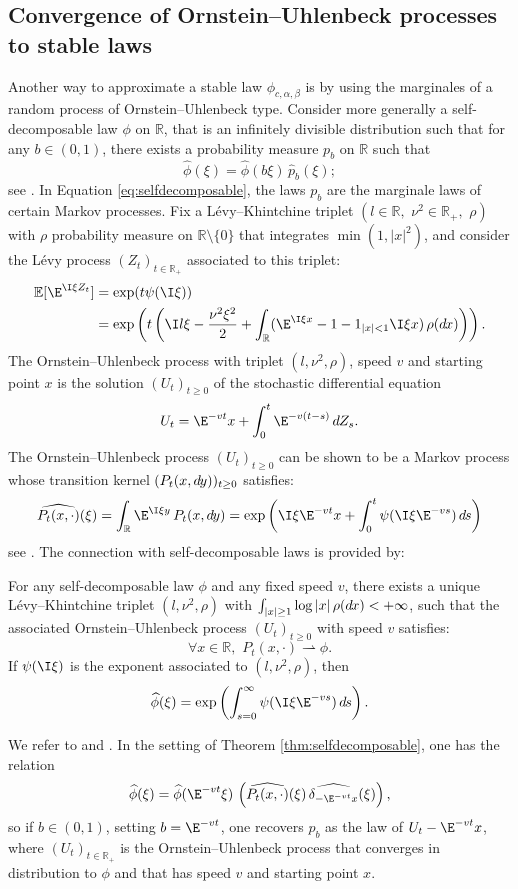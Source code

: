 \documentclass[envcountsame]{svmult}
\newcommand{\R}{\mathbb{R}}
\newcommand{\esper}{\mathbb{E}}
\newcommand{\DD}[1]{\,d\hspace*{-0.3mm}{#1}}
\begin{document}
\subsection{Convergence of Ornstein--Uhlenbeck processes to stable laws}\label{subsec:ornstein}
Another way to approximate a stable law $\phi_{c,\alpha,\beta}$ is by using the marginales of a random process of Ornstein--Uhlenbeck type. Consider more generally a self-decomposable law $\phi$ on $\R$, that is an infinitely divisible distribution such that for any $b\in (0,1)$, there exists a probability measure $p_b$ on $\R$ such that
\begin{equation}
\widehat{\phi}(\xi) = \widehat{\phi}(b\xi)\,\widehat{p}_b(\xi);\label{eq:selfdecomposable}
\end{equation}
see \cite[Chapter 3, Definition 15.1]{Sato99}. In Equation \eqref{eq:selfdecomposable}, the laws $p_b$ are the marginale laws of certain Markov processes. Fix a Lévy--Khintchine triplet $(l\in \R,\,\, \nu^2 \in \R_+,\,\,\rho)$ with $\rho$ probability measure on $\R \setminus \{0\}$ that integrates $\min(1,|x|^2)$, and consider the Lévy process $(Z_t)_{t \in \R_+}$ associated to this triplet:
\begin{align*}
\esper[\E^{\I \xi Z_t}] &= \exp(t\psi(\I \xi)) \\
&=  \exp\left(t\left(\I l \xi - \frac{\nu^2\xi^2}{2}+\int_{\R} (\E^{\I \xi x} - 1 - 1_{|x|<1}\I \xi x)\,\rho(\!\DD{x})\right)\right).
\end{align*}
The Ornstein--Uhlenbeck process with triplet $(l,\nu^2,\rho)$, speed $v$ and starting point $x$ is the solution $(U_t)_{t \geq 0}$ of the stochastic differential equation
$$U_t = \E^{-vt}x + \int_0^t \E^{-v(t-s)}\,dZ_s.$$
The Ornstein--Uhlenbeck process $(U_t)_{t \geq 0}$ can be shown to be a Markov process whose transition kernel
$(P_t(x,\!\DD{y}))_{t\geq 0}$ satisfies:
$$\widehat{P_t(x,\cdot)}(\xi) =\int_{\R} \E^{\I \xi y}\,P_t(x,\!\DD{y}) = \exp\left(\I \xi \E^{-vt} x + \int_{0}^t \psi(\I \xi\E^{-vs})\DD{s} \right)$$
see \cite[Lemma 17.1]{Sato99}. The connection with self-decomposable laws is provided by:
\begin{theorem}\label{thm:selfdecomposable}
For any self-decomposable law $\phi$ and any fixed speed $v$, there exists a unique Lévy--Khintchine triplet $(l,\nu^2,\rho)$ with $\int_{|x|\geq 1}\log |x|\,\rho(\!\DD{x})<+\infty$, such that the associated Ornstein--Uhlenbeck process $(U_t)_{t \geq 0}$ with speed $v$ satisfies:
$$\forall x \in \R,\,\,P_t(x,\cdot) \rightharpoonup \phi.$$
If $\psi(\I \xi)$ is the exponent associated to $(l,\nu^2,\rho)$, then 
$$\widehat{\phi}(\xi) = \exp\left(\int_{s=0}^\infty \psi(\I \xi\E^{-vs}) \DD{s}\right).$$
\end{theorem}
\noindent We refer to \cite{SY83} and \cite[Theorem 17.5]{Sato99}. In the setting of Theorem \ref{thm:selfdecomposable}, one has the relation 
$$\widehat{\phi}(\xi) = \widehat{\phi}(\E^{-vt}\xi)\,\left(\widehat{P_t(x,\cdot)}(\xi)\,\widehat{\delta_{-\E^{-vt}x}}(\xi)\right),$$
so if $b \in (0,1)$, setting $b=\E^{-vt}$, one recovers $p_b$ as the law of $U_t-\E^{-vt}x$, where $(U_t)_{t \in \R_+}$ is the Ornstein--Uhlenbeck process that converges in distribution to $\phi$ and that has speed $v$ and starting point $x$. \medskip
\end{document}
